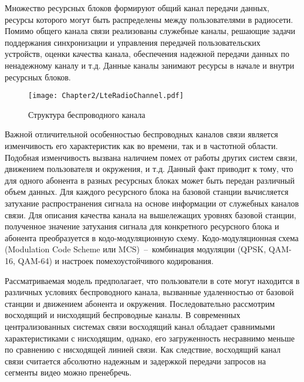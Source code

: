Множество ресурсных блоков формируют общий канал передачи данных, ресурсы которого могут быть распределены между пользователями в радиосети. Помимо общего канала связи реализованы служебные каналы, решающие задачи поддержания синхронизации и управления передачей пользовательских устройств, оценки качества канала, обеспечения надежной передачи данных по ненадежному каналу и т.д. Данные каналы занимают ресурсы в начале и внутри ресурсных блоков.

\begin{figure}[htbp]
\begin{center}
\texttt{[image: Chapter2/LteRadioChannel.pdf]}
\caption{Структура беспроводного канала}
\label{fig:LteRadioChannel}
\end{center}
\end{figure}

Важной отличительной особенностью беспроводных каналов связи является изменчивость его характеристик как во времени, так и в частотной области. Подобная изменчивость вызвана наличием помех от работы других систем связи, движением пользователя и окружения, и т.д. Данный факт приводит к тому, что для одного абонента в разных ресурсных блоках может быть передан различный объем данных. Для каждого ресурсного блока на базовой станции вычисляется затухание распространения сигнала на основе информации от служебных каналов связи. Для описания качества канала на вышележащих уровнях базовой станции, полученное значение затухания сигнала для конкретного ресурсного блока и абонента преобразуется в кодо-модуляционную схему. Кодо-модуляционная схема (Modulation Code Scheme или MCS)~--~комбинация модуляции (QPSK, QAM-16, QAM-64) и настроек помехоустойчивого кодирования. %

Рассматриваемая модель предполагает, что пользователи в соте могут находится в различных условиях беспроводного канала, вызванные удаленностью от базовой станции и движением абонента и окружения. Последовательно рассмотрим восходящий и нисходящий беспроводные каналы. В современных централизованных системах связи восходящий канал обладает сравнимыми характеристиками с нисходящим, однако, его загруженность несравнимо меньше по сравнению с нисходящей линией связи. Как следствие, восходящий канал связи считается абсолютно надежным и задержкой передачи запросов на сегменты видео можно пренебречь.

